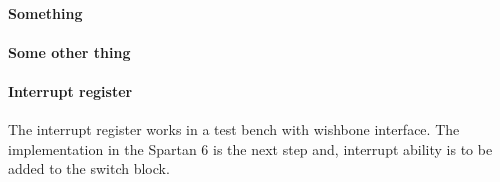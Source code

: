 \paragraph{Something}
\paragraph{Some other thing}
\paragraph{Interrupt register}
The interrupt register works in a test bench with wishbone interface. The implementation in the Spartan 6 is the next step and, interrupt ability is to be added to the switch block.
